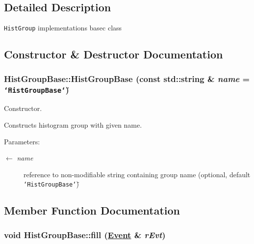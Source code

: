 \subsection{Detailed Description}
{\tt Hist\-Group} implementations basec class 



\subsection{Constructor \& Destructor Documentation}
\hypertarget{classHistGroupBase_7dcfcab8b9ec8a23632726d95600f21a}{
\subsubsection[HistGroupBase]{\setlength{\rightskip}{0pt plus 5cm}Hist\-Group\-Base::Hist\-Group\-Base (const std::string \& {\em name} = {\tt \char`\"{}HistGroupBase\char`\"{}})}}
\label{classHistGroupBase_7dcfcab8b9ec8a23632726d95600f21a}


Constructor. 

Constructs histogram group with given name.

\begin{Desc}
\item[Parameters:]
\begin{description}
\item[\mbox{$\leftarrow$} {\em name}]reference to non-modifiable string containing group name (optional, default {\tt \char`\"{}Hist\-Group\-Base\char`\"{}}) \end{description}
\end{Desc}


\subsection{Member Function Documentation}
\hypertarget{classHistGroupBase_746a5fc493cc64c27e8274757034ecec}{
\subsubsection[fill]{\setlength{\rightskip}{0pt plus 5cm}void Hist\-Group\-Base::fill (\hyperlink{classEvent}{Event} \& {\em r\-Evt})}}
\label{classHistGroupBase_746a5fc493cc64c27e8274757034ecec}


